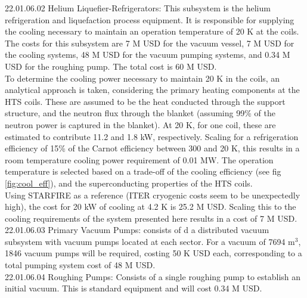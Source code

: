 \begin{table}[h]
    \centering
    \caption{Vacuum vessel parameters.}
    \label{tab:ves_params}
\end{table}






22.01.06.02 Helium Liquefier-Refrigerators: This subsystem is the helium refrigeration and liquefaction process equipment. It is responsible for supplying the cooling necessary to maintain an operation temperature of 20 K at the coils. \\

The costs for this subsystem are 7 M USD for the vacuum vessel, 7 M USD for the cooling systems, 48 M USD for the vacuum pumping systems, and 0.34 M USD for the roughing pump. The total cost is 60 M USD.\\

To determine the cooling power necessary to maintain 20 K in the coils, an analytical approach is taken, considering the primary heating components at the HTS coils. These are assumed to be the heat conducted through the support structure, and the neutron flux through the blanket (assuming 99\% of the neutron power is captured in the blanket). At 20 K, for one coil, these are estimated to contribute 11.2 and 1.8 kW, respectively. Scaling for a refrigeration efficiency of 15\% of the Carnot efficiency between 300 and 20 K, this results in a room temperature cooling power requirement of 0.01 MW. The operation temperature is selected based on a trade-off of the cooling efficiency (see fig \ref{fig:cool_eff}), and the superconducting properties of the HTS coils.\\

Using STARFIRE as a reference (ITER cryogenic costs seem to be unexpectedly high), the cost for 20 kW of cooling at 4.2 K is 25.2 M USD. Scaling this to the cooling requirements of the system presented here results in a cost of 7 M USD. \\



22.01.06.03 Primary Vacuum Pumps: consists of d a distributed vacuum subsystem with vacuum pumps located at each sector. For a vacuum of 7694 m$^3$, 1846 vacuum pumps will be required, costing 50 K USD each, corresponding to a total pumping system cost of 48 M USD.\\

22.01.06.04 Roughing Pumps: Consists of a single roughing pump to establish an initial vacuum. This is standard equipment and will cost 0.34 M USD.

